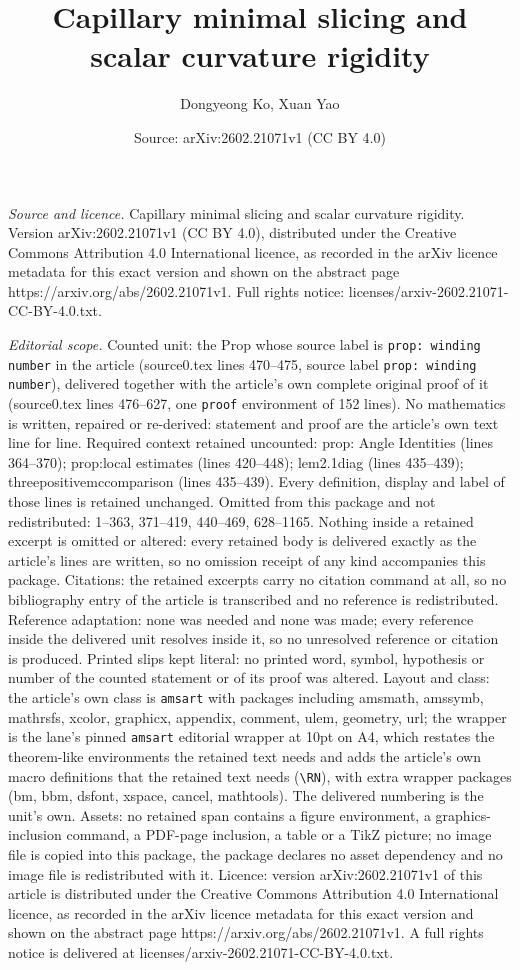 \documentclass[10pt,a4paper]{amsart}
\title[Capillary minimal slicing and scalar curvature rigidity]{Capillary minimal slicing and scalar curvature rigidity}
\author{Dongyeong Ko, Xuan Yao}
\date{Source: arXiv:2602.21071v1 (CC BY 4.0)}
\begin{document}
\maketitle

\noindent\emph{Source and licence.} Capillary minimal slicing and scalar curvature rigidity. Version arXiv:2602.21071v1 (CC BY 4.0), distributed under the Creative Commons Attribution 4.0 International licence, as recorded in the arXiv licence metadata for this exact version and shown on the abstract page https://arxiv.org/abs/2602.21071v1. Full rights notice: licenses/arxiv-2602.21071-CC-BY-4.0.txt.\par\smallskip

\noindent\textit{Editorial scope.} Counted unit: the Prop whose source label is \texttt{prop: winding number} in the article (source0.tex lines 470--475, source label \texttt{prop: winding number}), delivered together with the article's own complete original proof of it (source0.tex lines 476--627, one \texttt{proof} environment of 152 lines). No mathematics is written, repaired or re-derived: statement and proof are the article's own text line for line. Required context retained uncounted: prop: Angle Identities (lines 364--370); prop:local estimates (lines 420--448); lem2.1diag (lines 435--439); threepositivemccomparison (lines 435--439). Every definition, display and label of those lines is retained unchanged. Omitted from this package and not redistributed: 1--363, 371--419, 440--469, 628--1165. Nothing inside a retained excerpt is omitted or altered: every retained body is delivered exactly as the article's lines are written, so no omission receipt of any kind accompanies this package. Citations: the retained excerpts carry no citation command at all, so no bibliography entry of the article is transcribed and no reference is redistributed. Reference adaptation: none was needed and none was made; every reference inside the delivered unit resolves inside it, so no unresolved reference or citation is produced. Printed slips kept literal: no printed word, symbol, hypothesis or number of the counted statement or of its proof was altered. Layout and class: the article's own class is \texttt{amsart} with packages including amsmath, amssymb, mathrsfs, xcolor, graphicx, appendix, comment, ulem, geometry, url; the wrapper is the lane's pinned \texttt{amsart} editorial wrapper at 10pt on A4, which restates the theorem-like environments the retained text needs and adds the article's own macro definitions that the retained text needs (\texttt{\textbackslash RN}), with extra wrapper packages (bm, bbm, dsfont, xspace, cancel, mathtools). The delivered numbering is the unit's own. Assets: no retained span contains a figure environment, a graphics-inclusion command, a PDF-page inclusion, a table or a TikZ picture; no image file is copied into this package, the package declares no asset dependency and no image file is redistributed with it. Licence: version arXiv:2602.21071v1 of this article is distributed under the Creative Commons Attribution 4.0 International licence, as recorded in the arXiv licence metadata for this exact version and shown on the abstract page https://arxiv.org/abs/2602.21071v1. A full rights notice is delivered at licenses/arxiv-2602.21071-CC-BY-4.0.txt. 
\end{document}
